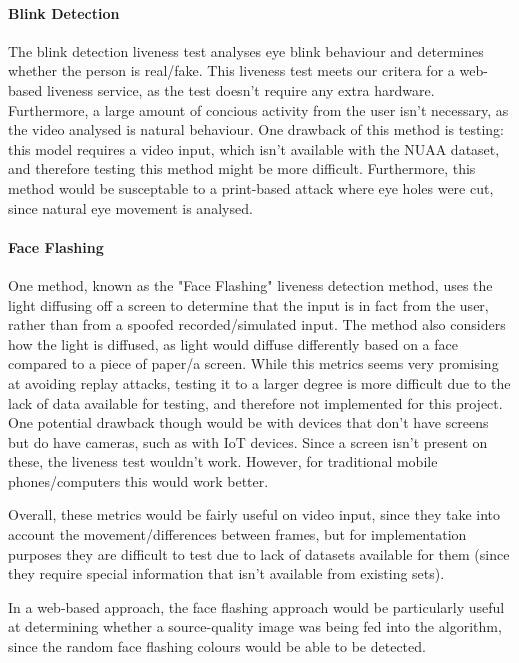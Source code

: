 \documentclass[11pt,a4paper]{article}
\begin{document}
        \paragraph{Blink Detection}
        The blink detection liveness test analyses eye blink behaviour and determines whether the person is real/fake. This liveness test meets our critera for a web-based liveness service,
        as the test doesn't require any extra hardware. Furthermore, a large amount of concious activity from the user isn't necessary, as the video analysed is natural behaviour.
        One drawback of this method is testing: this model requires a video input, which isn't available with the NUAA dataset, and therefore testing this method might be more difficult.
        \cite{BlinkDetectionLivenessTest} Furthermore, this method would be susceptable to a print-based attack where eye holes were cut, since natural eye movement is analysed.
        
        \paragraph{Face Flashing}
        One method, known as the "Face Flashing" liveness detection method, uses the light diffusing off a screen to determine that the input is in fact from the user, rather than from a spoofed recorded/simulated input.
        The method also considers how the light is diffused, as light would diffuse differently based on a face compared to a piece of paper/a screen. \cite{LivenessTestFaceFlashing}
        While this metrics seems very promising at avoiding replay attacks, testing it to a larger degree is more difficult due to the lack of data available for testing, and therefore not implemented for this project.
        One potential drawback though would be with devices that don't have screens but do have cameras, such as with IoT devices. Since a screen isn't present on these, the liveness test wouldn't work. However, for traditional mobile phones/computers
        this would work better.

        Overall, these metrics would be fairly useful on video input, since they take into account the movement/differences between frames, but for implementation purposes they are difficult to test due to lack of datasets available for them
        (since they require special information that isn't available from existing sets). 

        In a web-based approach, the face flashing approach would be particularly useful at determining whether a source-quality image was being fed into the algorithm, since the random face flashing colours would be able to be detected.
        
\end{document}
